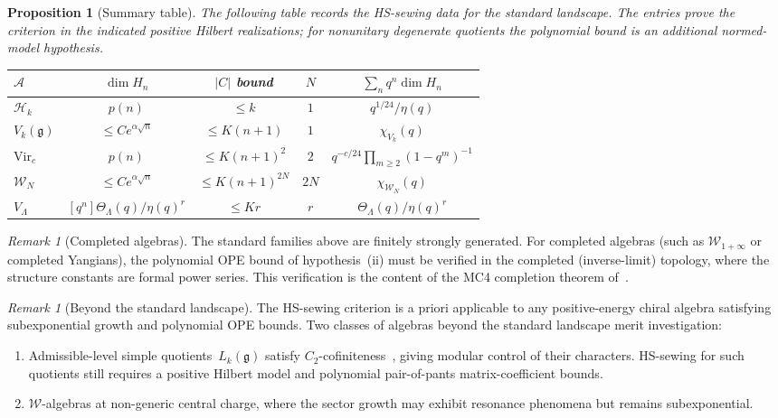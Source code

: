 \documentclass[11pt,reqno]{amsart}
\newtheorem{proposition}[theorem]{Proposition}
\theoremstyle{definition}
\theoremstyle{remark}
\newtheorem{remark}[theorem]{Remark}
\newcommand{\cA}{\mathcal{A}}
\newcommand{\cH}{\mathcal{H}}
\newcommand{\cW}{\mathcal{W}}
\newcommand{\Vir}{\mathrm{Vir}}
\newcommand{\fg}{\mathfrak{g}}
\numberwithin{equation}{section}
\begin{document}
\begin{proposition}[Summary table]\label{prop:summary-table}
The following table records the HS-sewing data for the standard
landscape.  The entries prove the criterion in the indicated
positive Hilbert realizations; for nonunitary degenerate quotients
the polynomial bound is an additional normed-model hypothesis.
\begin{center}
\renewcommand{\arraystretch}{1.15}
\begin{tabular}{l|ccc|c}
\toprule
$\cA$ & $\dim H_n$ & $|C|$ bound & $N$ &
 $\sum_n q^n\dim H_n$ \\
\midrule
$\cH_k$ & $p(n)$ & $\leq k$
 & $1$ & $q^{1/24}/\eta(q)$ \\
$V_k(\fg)$ & $\leq Ce^{\alpha\sqrt{n}}$
 & $\leq K(n+1)$ & $1$ & $\chi_{V_k}(q)$ \\
$\Vir_c$ & $p(n)$
 & $\leq K(n+1)^2$ & $2$
 & $q^{-c/24}\prod_{m\ge2}(1-q^m)^{-1}$ \\
$\cW_N$ & $\leq Ce^{\alpha\sqrt{n}}$
 & $\leq K(n+1)^{2N}$ & $2N$
 & $\chi_{\cW_N}(q)$ \\
$V_\Lambda$ & $[q^n]\Theta_\Lambda(q)/\eta(q)^r$
 & $\leq Kr$ & $r$
 & $\Theta_\Lambda(q)/\eta(q)^r$ \\
\bottomrule
\end{tabular}
\end{center}
\end{proposition}

\begin{remark}[Completed algebras]\label{rem:completed}
The standard families above are finitely strongly generated.
For completed algebras (such as $\cW_{1+\infty}$ or completed
Yangians), the polynomial OPE bound of hypothesis~(ii) must be
verified in the completed (inverse-limit) topology, where the
structure constants are formal power series.  This verification
is the content of the MC4 completion theorem
of~\cite{LorgatVolI}.
\end{remark}

\begin{remark}[Beyond the standard landscape]
\label{rem:beyond-standard}
The HS-sewing criterion is a priori applicable to any
positive-energy chiral algebra satisfying subexponential growth
and polynomial OPE bounds.  Two classes of algebras beyond the
standard landscape merit investigation:
\begin{enumerate}[label=\textup{(\alph*)}]
\item Admissible-level simple quotients~$L_k(\fg)$ satisfy
 $C_2$-cofiniteness~\cite{Zhu96}, giving modular control of their
 characters. HS-sewing for such quotients still requires a positive
 Hilbert model and polynomial pair-of-pants matrix-coefficient
 bounds.
\item $\cW$-algebras at non-generic central charge, where the
 sector growth may exhibit resonance phenomena but remains
 subexponential.
\end{enumerate}
\end{remark}
\end{document}
